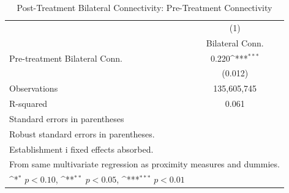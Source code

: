 \begin{table}[htbp]\centering
\def\sym#1{\ifmmode^{#1}\else\(^{#1}\)\fi}
\caption{Post-Treatment Bilateral Connectivity: Pre-Treatment Connectivity}
\begin{tabular}{l*{1}{c}}
\toprule
                    &\multicolumn{1}{c}{(1)}\\
                    &\multicolumn{1}{c}{Bilateral Conn.}\\
\midrule
Pre-treatment Bilateral Conn.&       0.220\sym{***}\\
                    &     (0.012)         \\
\midrule
Observations        & 135,605,745         \\
R-squared           &       0.061         \\
\bottomrule
\multicolumn{2}{l}{\footnotesize Standard errors in parentheses}\\
\multicolumn{2}{l}{\footnotesize Robust standard errors in parentheses.}\\
\multicolumn{2}{l}{\footnotesize Establishment i fixed effects absorbed.}\\
\multicolumn{2}{l}{\footnotesize From same multivariate regression as proximity measures and dummies.}\\
\multicolumn{2}{l}{\footnotesize \sym{*} \(p<0.10\), \sym{**} \(p<0.05\), \sym{***} \(p<0.01\)}\\
\end{tabular}
\end{table}
